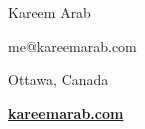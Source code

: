 \documentclass{article}
\begin{document}
    \begin{changemargin}{2cm}{-2cm}
        \begin{center}
        {\Huge Kareem Arab}\par\smallskip\smallskip

        \begin{minipage}[b]{0.33333\textwidth}
        \centering
            me@kareemarab.com  \par
            Ottawa, Canada\par
            \textbf{\href{http://kareemarab.com}{kareemarab.com}}
        \end{minipage}
        \end{center}
    \end{changemargin}
\end{document}
